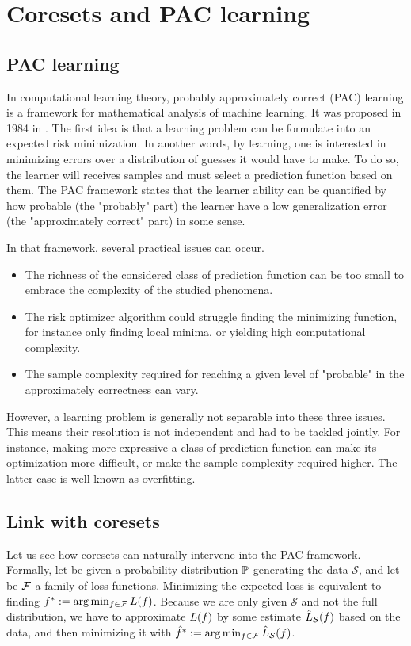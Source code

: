 \section{Coresets and PAC learning}
\subsection{PAC learning}In computational learning theory, probably approximately correct (PAC) learning is a framework for mathematical analysis of machine learning. It was proposed in 1984 in \cite{valiant1984learnable}. The first idea is that a learning problem can be formulate into an expected risk minimization. In another words, by learning, one is interested in minimizing errors over a distribution of guesses it would have to make. To do so, the learner will receives samples and must select a prediction function based on them. The PAC framework states that the learner ability can be quantified by how probable (the "probably" part) the learner have a low generalization error (the "approximately correct" part) in some sense.



In that framework, several practical issues can occur. 
\begin{itemize}
    \item The richness of the considered class of prediction function can be too small to embrace the complexity of the studied phenomena.
    \item The risk optimizer algorithm could struggle finding the minimizing function, for instance only finding local minima, or yielding high computational complexity.
    \item The sample complexity required for reaching a given level of "probable" in the approximately correctness can vary.
\end{itemize}

However, a learning problem is generally not separable into these three issues. This means their resolution is not independent and had to be tackled jointly. For instance, making more expressive a class of prediction function can make its optimization more difficult, or make the sample complexity required higher. The latter case is well known as overfitting.

\subsection{Link with coresets}

Let us see how coresets can naturally intervene into the PAC framework. Formally, let be given a probability distribution $\mathbb{P}$ generating the data $\mathcal{S}$, and let be $\mathcal{F}$ a family of loss functions. Minimizing the expected loss is equivalent to finding $f^*:= \arg \min_{f \in \mathcal{F}} L (f)$. Because we are only given $\mathcal{S}$ and not the full distribution, we have to approximate $L(f)$ by some estimate $\hat{L}_{\mathcal{S}}(f)$ based on the data, and then minimizing it with $\hat{f}^* := \arg \min_{f\in \mathcal{F}} \hat{L}_{\mathcal{S}}(f)$. 


